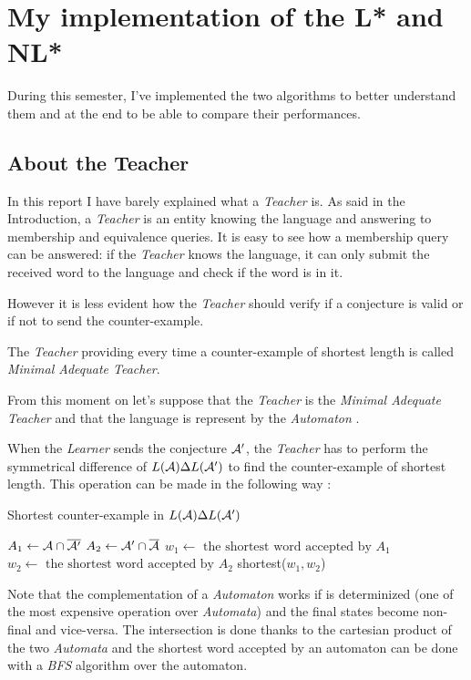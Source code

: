 \section{My implementation of the L* and NL*}
During this semester, I've implemented the two algorithms to better understand them and at the end to be able to compare their performances.

\subsection{About the Teacher}
In this report I have barely explained what a \textit{Teacher} is. As said in the Introduction, a \textit{Teacher} is an entity knowing the language and answering to membership and equivalence queries. It is easy to see how a membership query can be answered: if the \textit{Teacher} knows the language, it can only submit the received word to the language and check if the word is in it.

However it is less evident how the \textit{Teacher} should verify if a conjecture is valid or if not to send the counter-example.
\begin{definition}
  The \textit{Teacher} providing every time a counter-example of shortest length is called \textit{Minimal Adequate Teacher}.
\end{definition}

From this moment on let's suppose that the \textit{Teacher} is the \textit{Minimal Adequate Teacher} and that the language is represent by the \textit{Automaton} \automaton{}.

When the \textit{Learner} sends the conjecture $\mathcal{A}'$, the \textit{Teacher} has to perform the symmetrical difference of $L(\mathcal{A}) \Delta L(\mathcal{A'})$ to find the counter-example of shortest length. This operation can be made in the following way :

\begin{algorithm}
  \caption{Shortest counter-example in $L(\mathcal{A}) \Delta L(\mathcal{A'})$}
  $A_1 \gets \mathcal{A} \cap \overline{\mathcal{A'}}$\;
  $A_2 \gets \mathcal{A'} \cap \overline{\mathcal{A}}$\;
  $w_1 \gets \text{ the shortest word accepted by } A_1$\;
  $w_2 \gets \text{ the shortest word accepted by } A_2$\;
  \Return shortest($w_1, w_2$)\;
\end{algorithm}

Note that the complementation of a \textit{Automaton} \automaton{} works if \automaton{} is determinized (one of the most expensive operation over \textit{Automata}) and the final states become non-final and vice-versa. The intersection is done thanks to the cartesian product of the two \textit{Automata} and the shortest word accepted by an automaton can be done with a \textit{BFS} algorithm over the automaton.

